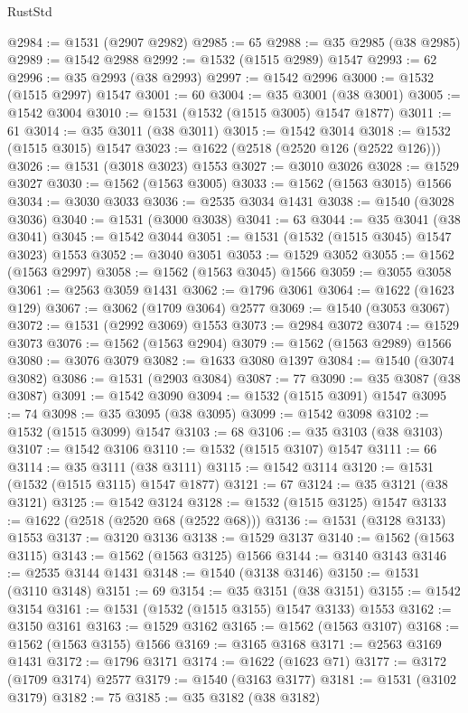 \begin{lexlean}{RustStd}
\begin{coremodule}
@2984 := @1531 (@2907 @2982)
@2985 := 65
@2988 := @35 @2985 (@38 @2985)
@2989 := @1542 @2988
@2992 := @1532 (@1515 @2989) @1547
@2993 := 62
@2996 := @35 @2993 (@38 @2993)
@2997 := @1542 @2996
@3000 := @1532 (@1515 @2997) @1547
@3001 := 60
@3004 := @35 @3001 (@38 @3001)
@3005 := @1542 @3004
@3010 := @1531 (@1532 (@1515 @3005) @1547 @1877)
@3011 := 61
@3014 := @35 @3011 (@38 @3011)
@3015 := @1542 @3014
@3018 := @1532 (@1515 @3015) @1547
@3023 := @1622 (@2518 (@2520 @126 (@2522 @126)))
@3026 := @1531 (@3018 @3023) @1553
@3027 := @3010 @3026
@3028 := @1529 @3027
@3030 := @1562 (@1563 @3005)
@3033 := @1562 (@1563 @3015) @1566
@3034 := @3030 @3033
@3036 := @2535 @3034 @1431
@3038 := @1540 (@3028 @3036)
@3040 := @1531 (@3000 @3038)
@3041 := 63
@3044 := @35 @3041 (@38 @3041)
@3045 := @1542 @3044
@3051 := @1531 (@1532 (@1515 @3045) @1547 @3023) @1553
@3052 := @3040 @3051
@3053 := @1529 @3052
@3055 := @1562 (@1563 @2997)
@3058 := @1562 (@1563 @3045) @1566
@3059 := @3055 @3058
@3061 := @2563 @3059 @1431
@3062 := @1796 @3061
@3064 := @1622 (@1623 @129)
@3067 := @3062 (@1709 @3064) @2577
@3069 := @1540 (@3053 @3067)
@3072 := @1531 (@2992 @3069) @1553
@3073 := @2984 @3072
@3074 := @1529 @3073
@3076 := @1562 (@1563 @2904)
@3079 := @1562 (@1563 @2989) @1566
@3080 := @3076 @3079
@3082 := @1633 @3080 @1397
@3084 := @1540 (@3074 @3082)
@3086 := @1531 (@2903 @3084)
@3087 := 77
@3090 := @35 @3087 (@38 @3087)
@3091 := @1542 @3090
@3094 := @1532 (@1515 @3091) @1547
@3095 := 74
@3098 := @35 @3095 (@38 @3095)
@3099 := @1542 @3098
@3102 := @1532 (@1515 @3099) @1547
@3103 := 68
@3106 := @35 @3103 (@38 @3103)
@3107 := @1542 @3106
@3110 := @1532 (@1515 @3107) @1547
@3111 := 66
@3114 := @35 @3111 (@38 @3111)
@3115 := @1542 @3114
@3120 := @1531 (@1532 (@1515 @3115) @1547 @1877)
@3121 := 67
@3124 := @35 @3121 (@38 @3121)
@3125 := @1542 @3124
@3128 := @1532 (@1515 @3125) @1547
@3133 := @1622 (@2518 (@2520 @68 (@2522 @68)))
@3136 := @1531 (@3128 @3133) @1553
@3137 := @3120 @3136
@3138 := @1529 @3137
@3140 := @1562 (@1563 @3115)
@3143 := @1562 (@1563 @3125) @1566
@3144 := @3140 @3143
@3146 := @2535 @3144 @1431
@3148 := @1540 (@3138 @3146)
@3150 := @1531 (@3110 @3148)
@3151 := 69
@3154 := @35 @3151 (@38 @3151)
@3155 := @1542 @3154
@3161 := @1531 (@1532 (@1515 @3155) @1547 @3133) @1553
@3162 := @3150 @3161
@3163 := @1529 @3162
@3165 := @1562 (@1563 @3107)
@3168 := @1562 (@1563 @3155) @1566
@3169 := @3165 @3168
@3171 := @2563 @3169 @1431
@3172 := @1796 @3171
@3174 := @1622 (@1623 @71)
@3177 := @3172 (@1709 @3174) @2577
@3179 := @1540 (@3163 @3177)
@3181 := @1531 (@3102 @3179)
@3182 := 75
@3185 := @35 @3182 (@38 @3182)

\end{coremodule}
\end{lexlean}
